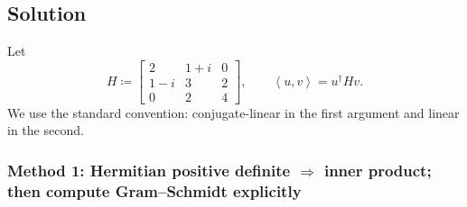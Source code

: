 \documentclass[12pt]{article}
\newcommand{\df}{\coloneqq}
\newcommand{\ip}[2]{\left\langle #1,#2\right\rangle}
\begin{document}
\subsection{Solution}
Let
\[
H\df
\begin{bmatrix}
2 & 1+i & 0\\
1-i & 3 & 2\\
0 & 2 & 4
\end{bmatrix},
\qquad
\ip{u}{v}=u^\dagger H v.
\]
We use the standard convention: conjugate-linear in the first argument and linear in the second.

\subsubsection{Method 1: Hermitian positive definite $\Rightarrow$ inner product; then compute Gram--Schmidt explicitly}
\end{document}
